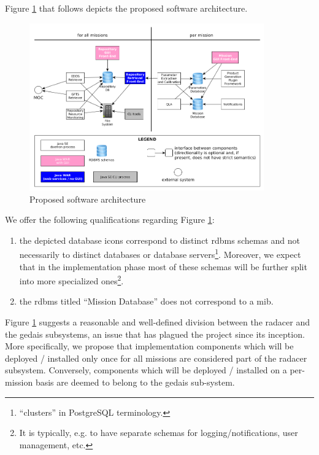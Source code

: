 \documentclass[9pt,twoside,openright,a4paper,pagesize]{report}
\begin{document}
Figure \ref{fig:sw-arch} that follows depicts the proposed
software architecture.
  \begin{figure}[htbp]
    \centering
    \hspace*{-0.7cm}
      \includegraphics[width=0.9\textwidth]{sw-arch.png}
    \caption{Proposed software architecture}
    \label{fig:sw-arch}
  \end{figure}

  We offer the following qualifications regarding Figure \ref{fig:sw-arch}:
  \begin{enumerate}
  \item the depicted database icons correspond to distinct \gls{rdbms} schemas
    and not necessarily to distinct databases or database servers\footnote{``clusters'' in
      PostgreSQL terminology.}. Moreover, we expect that in the implementation phase
    most of these schemas will be further split into more specialized ones\footnote{It
    is typically, e.g. to have separate schemas for logging/notifications, user management, etc.}.
  \item the \gls{rdbms} titled ``Mission Database'' does not correspond to a \gls{mib}.
  \end{enumerate}

  Figure \ref{fig:sw-arch} suggests a reasonable and well-defined division between the
  \gls{radacer} and the \gls{gedais} subsystems, an issue that has plagued the project since
  its inception. More specifically, we propose that implementation components which will be
  deployed / installed only once for all missions are considered part of the \gls{radacer}
  subsystem. Conversely, components which will be deployed / installed on a per-mission
  basis are deemed to belong to the \gls{gedais} sub-system.
\end{document}
